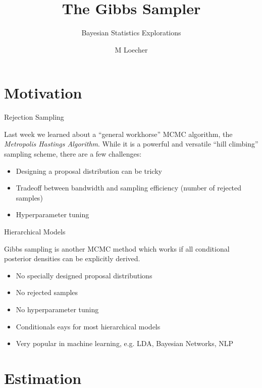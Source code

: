 \documentclass[
  ignorenonframetext,
]{beamer}
\title{The Gibbs Sampler}
\subtitle{Bayesian Statistics Explorations}
\author{M Loecher}
\date{}
\begin{document}
\frame{\titlepage}

\begin{frame}
  \tableofcontents[hideallsubsections]
\end{frame}
\hypertarget{motivation}{%
\section{Motivation}\label{motivation}}

\begin{frame}{Rejection Sampling}
\protect\hypertarget{rejection-sampling}{}

Last week we learned about a ``general workhorse'' MCMC algorithm, the
\textit{Metropolis Hastings Algorithm}. While it is a powerful and
versatile ``hill climbing'' sampling scheme, there are a few challenges:

\begin{itemize}
  \item Designing a proposal distribution can be tricky
  \item Tradeoff between bandwidth and sampling efficiency (number of rejected samples)
  \item Hyperparameter tuning
\end{itemize}

\end{frame}

\begin{frame}{Hierarchical Models}
\protect\hypertarget{hierarchical-models}{}

Gibbs sampling is another MCMC method which works if all conditional
posterior densities can be explicitly derived.

\begin{itemize}
  \item No specially designed proposal distributions 
  \item No rejected samples
  \item No hyperparameter tuning
  \item Conditionals eays for most hierarchical models
  \item Very popular in machine learning, e.g. LDA, Bayesian Networks, NLP 
\end{itemize}

\end{frame}

\hypertarget{estimation}{%
\section{Estimation}\label{estimation}}
\end{document}
